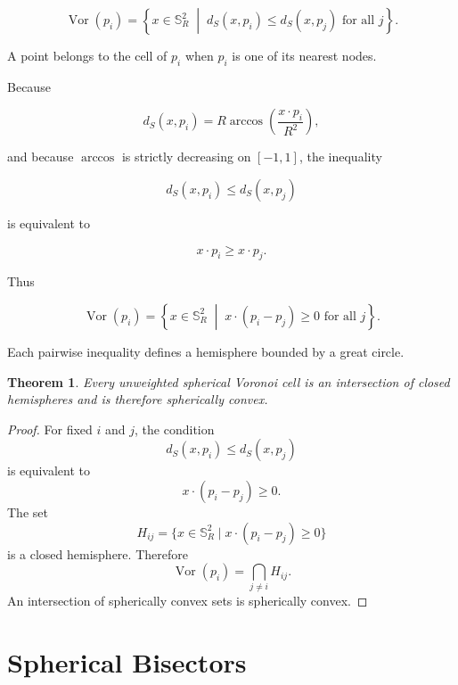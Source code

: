 \documentclass[11pt,fleqn]{book}
\numberwithin{equation}{chapter}
\theoremstyle{plain}
\newtheorem{theorem}{Theorem}[chapter]
\theoremstyle{definition}
\theoremstyle{remark}
\newcommand{\Sphere}{\mathbb{S}^{2}}
\newcommand{\Vor}{\operatorname{Vor}}
\newcommand{\suchthat}{\;\middle|\;}
\begin{document}
\begin{equation}
    \Vor(p_i)
    =
    \left\{
    x\in\Sphere_R
    \suchthat
    d_S(x,p_i)
    \leq
    d_S(x,p_j)
    \text{ for all }j
    \right\}.
\end{equation}

A point belongs to the cell of \(p_i\) when \(p_i\) is one of its nearest nodes.

Because

\begin{equation}
    d_S(x,p_i)
    =
    R\arccos\left(
      \frac{x\cdot p_i}{R^2}
    \right),
\end{equation}

and because \(\arccos\) is strictly decreasing on \([-1,1]\), the inequality

\begin{equation}
    d_S(x,p_i)
    \leq
    d_S(x,p_j)
\end{equation}

is equivalent to

\begin{equation}
    x\cdot p_i
    \geq
    x\cdot p_j.
\end{equation}

Thus

\begin{equation}
    \Vor(p_i)
    =
    \left\{
    x\in\Sphere_R
    \suchthat
    x\cdot(p_i-p_j)\geq 0
    \text{ for all }j
    \right\}.
\end{equation}

Each pairwise inequality defines a hemisphere bounded by a great circle.

\begin{theorem}
Every unweighted spherical Voronoi cell is an intersection of closed hemispheres and is therefore spherically convex.
\end{theorem}

\begin{proof}
For fixed \(i\) and \(j\), the condition
\[
d_S(x,p_i)\leq d_S(x,p_j)
\]
is equivalent to
\[
x\cdot(p_i-p_j)\geq 0.
\]
The set
\[
H_{ij}
=
\{x\in\Sphere_R\mid x\cdot(p_i-p_j)\geq 0\}
\]
is a closed hemisphere. Therefore
\[
\Vor(p_i)
=
\bigcap_{j\neq i}H_{ij}.
\]
An intersection of spherically convex sets is spherically convex.
\end{proof}

\section{Spherical Bisectors}
\end{document}
